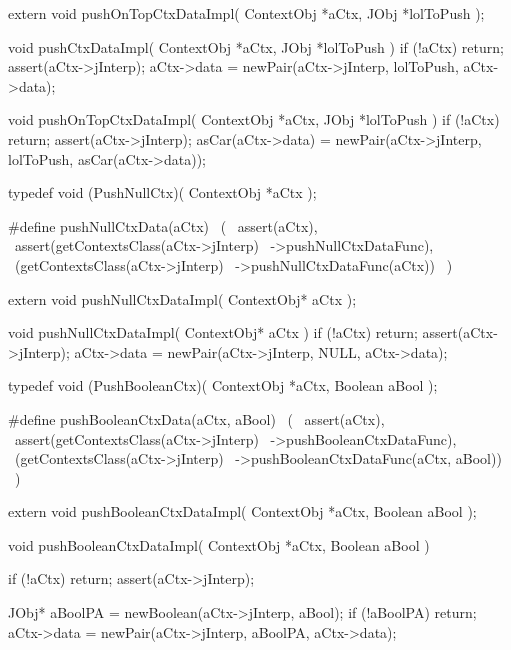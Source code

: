 extern void pushOnTopCtxDataImpl(
  ContextObj *aCtx,
  JObj       *lolToPush
);
\stopCHeader
{}

\startCCode
void pushCtxDataImpl(
  ContextObj *aCtx,
  JObj       *lolToPush
) {
  if (!aCtx) return;
  assert(aCtx->jInterp);
  aCtx->data = newPair(aCtx->jInterp, lolToPush, aCtx->data);
}

void pushOnTopCtxDataImpl(
  ContextObj *aCtx,
  JObj       *lolToPush
) {
  if (!aCtx) return;
  assert(aCtx->jInterp);
  asCar(aCtx->data) =
    newPair(aCtx->jInterp, lolToPush, asCar(aCtx->data));
}
\stopCCode

\startCHeader
typedef void (PushNullCtx)(
  ContextObj *aCtx
);

#define pushNullCtxData(aCtx)               \
  (                                         \
    assert(aCtx),                           \
    assert(getContextsClass(aCtx->jInterp)  \
      ->pushNullCtxDataFunc),               \
    (getContextsClass(aCtx->jInterp)        \
      ->pushNullCtxDataFunc(aCtx))          \
  )
\stopCHeader

\setCHeaderStream{private}
\startCHeader
extern void pushNullCtxDataImpl(
  ContextObj* aCtx
);
\stopCHeader
{}

\startCCode
void pushNullCtxDataImpl(
  ContextObj* aCtx
) {
  if (!aCtx) return;
  assert(aCtx->jInterp);
  aCtx->data = newPair(aCtx->jInterp, NULL, aCtx->data);
}
\stopCCode

\startCHeader
typedef void (PushBooleanCtx)(
  ContextObj *aCtx,
  Boolean     aBool
);

#define pushBooleanCtxData(aCtx, aBool)      \
  (                                          \
    assert(aCtx),                            \
    assert(getContextsClass(aCtx->jInterp)   \
      ->pushBooleanCtxDataFunc),             \
    (getContextsClass(aCtx->jInterp)         \
      ->pushBooleanCtxDataFunc(aCtx, aBool)) \
  )
\stopCHeader

\startCHeader
extern void pushBooleanCtxDataImpl(
  ContextObj *aCtx,
  Boolean     aBool
);
\stopCHeader
\setCHeaderStream{public}

\startCCode
void pushBooleanCtxDataImpl(
  ContextObj *aCtx,
  Boolean     aBool
) {
  if (!aCtx) return;
  assert(aCtx->jInterp);

  JObj* aBoolPA = newBoolean(aCtx->jInterp, aBool);
  if (!aBoolPA) return;
  aCtx->data = newPair(aCtx->jInterp, aBoolPA, aCtx->data);
}
\stopCCode

